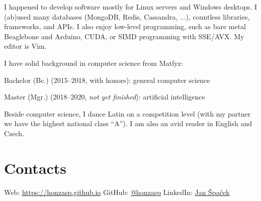 \documentclass[11pt,a4paper]{article}
\begin{document}
\begin{multicols}{2}
I happened to develop software mostly for Linux servers and Windows desktops. I
(ab)used many databases (MongoDB, Redis, Cassandra, ...), countless libraries,
frameworks, and APIs. I also enjoy low-level programming, such as bare metal
Beaglebone and Arduino, CUDA, or SIMD programming with SSE/AVX. My editor is
Vim.

I have solid background in computer science from Matfyz:
\begin{compactitem}
\item Bachelor (Bc.) (2015–2018, with honors): general computer science
\item Master (Mgr.) (2018–2020, \textit{not yet finished}): artificial intelligence
\end{compactitem}

Beside computer science, I dance Latin on a competition level (with my partner
we have the highest national class ``A''). I am also an avid reader in English and
Czech.

\section*{Contacts}

Web: \url{https://honzasp.github.io}\newline
GitHub: \href{https://github.com/honzasp}{@honzasp}\newline
LinkedIn: \href{https://www.linkedin.com/in/jan-%C5%A1pa%C4%8Dek-3155b4136/}{Jan
Špaček}\newline

\end{multicols}
\end{document}
